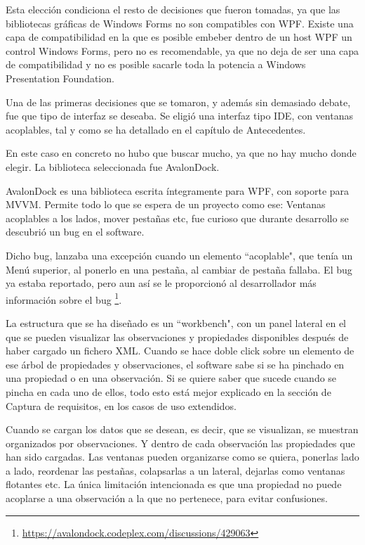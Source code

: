 Esta elecci\'on condiciona el resto de decisiones que fueron tomadas, ya que las bibliotecas gr\'aficas
de Windows Forms no son compatibles con WPF. Existe una capa de compatibilidad en la que es posible embeber dentro
de un host WPF un control Windows Forms, pero no es recomendable, ya que no deja de ser una capa de compatibilidad y
no es posible sacarle toda la potencia a Windows Presentation Foundation.

Una de las primeras decisiones que se tomaron, y adem\'as sin demasiado debate, fue que tipo de interfaz se deseaba.
Se eligi\'o una interfaz tipo IDE, con ventanas acoplables, tal y como se ha detallado en el cap\'itulo de Antecedentes.

En este caso en concreto no hubo que buscar mucho, ya que no hay mucho donde elegir. La biblioteca seleccionada
fue AvalonDock.

AvalonDock es una biblioteca escrita \'integramente para WPF, con soporte para MVVM. Permite todo lo que se espera
de un proyecto como ese: Ventanas acoplables a los lados, mover pesta\~nas etc, fue curioso que durante desarrollo se descubri\'o
un bug en el software.

Dicho bug, lanzaba una excepci\'on cuando un elemento ``acoplable", que ten\'ia un Men\'u superior, al ponerlo
en una pesta\~na, al cambiar de pesta\~na fallaba. El bug ya estaba reportado, pero aun as\'i se le proporcion\'o
al desarrollador m\'as informaci\'on sobre el bug \footnote{\url{https://avalondock.codeplex.com/discussions/429063}}.

La estructura que se ha dise\~nado es un ``workbench", con un panel lateral en el que se pueden visualizar las observaciones
y propiedades disponibles despu\'es de haber cargado un fichero XML. Cuando se hace doble click sobre un elemento
de ese \'arbol de propiedades y observaciones, el software sabe si se ha pinchado en una propiedad o en una observaci\'on.
Si se quiere saber que sucede cuando se pincha en cada uno de ellos, todo esto est\'a mejor explicado en la secci\'on de
Captura de requisitos, en los casos de uso extendidos.

Cuando se cargan los datos que se desean, es decir, que se visualizan, se muestran organizados por observaciones. Y dentro de cada
observaci\'on las propiedades que han sido cargadas. Las ventanas pueden organizarse como se quiera, ponerlas lado a lado,
reordenar las pesta\~nas, colapsarlas a un lateral, dejarlas como ventanas flotantes etc. 
La \'unica limitaci\'on intencionada es que una propiedad no puede acoplarse a una observaci\'on a la que no pertenece,
para evitar confusiones.

